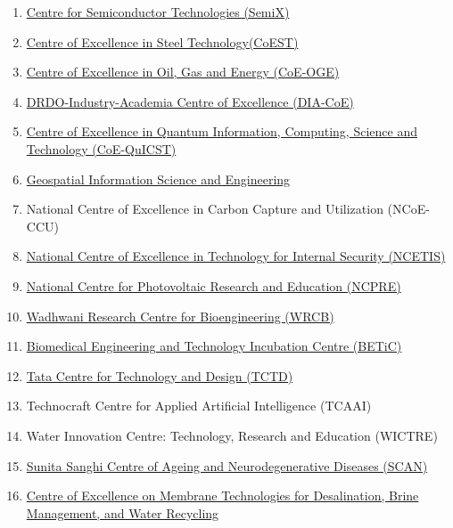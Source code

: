 \documentclass[
  10pt,
  a5paper,
  10pt,
  openany]{amsbook}
\providecommand{\tightlist}{%
  \setlength{\itemsep}{0pt}\setlength{\parskip}{0pt}}
\begin{document}
\begin{enumerate}
\def\labelenumi{\arabic{enumi}.}
\tightlist
\item
  \href{https://www.semix.iitb.ac.in/semix/}{Centre for Semiconductor
  Technologies (SemiX)}
\item
  \href{https://www.iitb.ac.in/mems/en/research/coest\#:~:text=Indian\%20Institute\%20of\%20Technology\%20Bombay\%20(IIT\%20Bombay)\%20establish\%20a\%20Centre,Board\%20of\%20Governors\%2C\%20IIT\%20Bombay.}{Centre
  of Excellence in Steel Technology(CoEST)}
\item
  \href{http://www.coeoge.iitb.ac.in/}{Centre of Excellence in Oil, Gas
  and Energy (CoE-OGE)}
\item
  \href{https://www.iitb.ac.in/taxonomy/term/142}{DRDO-Industry-Academia
  Centre of Excellence (DIA-CoE)}
\item
  \href{https://www.quicst.org/}{Centre of Excellence in Quantum
  Information, Computing, Science and Technology (CoE-QuICST)}
\item
  \href{https://www.iitb.ac.in/taxonomy/term/143}{Geospatial Information
  Science and Engineering}
\item
  National Centre of Excellence in Carbon Capture and Utilization
  (NCoE-CCU)
\item
  \href{https://www.ee.iitb.ac.in/~ncetis/}{National Centre of
  Excellence in Technology for Internal Security (NCETIS)}
\item
  \href{http://www.ncpre.iitb.ac.in/ncpre/}{National Centre for
  Photovoltaic Research and Education (NCPRE)}
\item
  \href{http://www.iitb.ac.in/wrcb/}{Wadhwani Research Centre for
  Bioengineering (WRCB)}
\item
  \href{https://www.betic.org/}{Biomedical Engineering and Technology
  Incubation Centre (BETiC)}
\item
  \href{http://www.tatacentre.iitb.ac.in/}{Tata Centre for Technology
  and Design (TCTD)}
\item
  Technocraft Centre for Applied Artificial Intelligence (TCAAI)
\item
  Water Innovation Centre: Technology, Research and Education (WICTRE)
\item
  \href{https://www.scan.iitb.ac.in/}{Sunita Sanghi Centre of Ageing and
  Neurodegenerative Diseases (SCAN)}
\item
  \href{https://www.desaltm.in/}{Centre of Excellence on Membrane
  Technologies for Desalination, Brine Management, and Water Recycling}
\end{enumerate}
\end{document}
